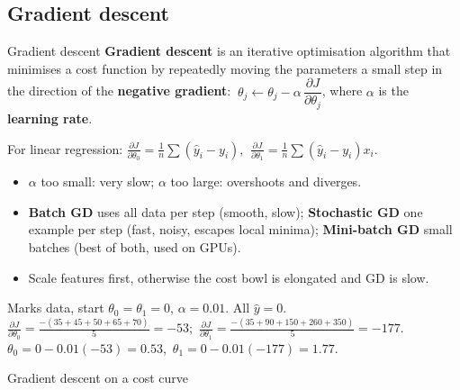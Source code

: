 \subsection{Gradient descent}
\begin{dfn}{Gradient descent}
\textbf{Gradient descent} is an iterative optimisation algorithm that minimises a cost function by repeatedly moving the parameters a small step in the direction of the \textbf{negative gradient}:
$\ \theta_j\leftarrow\theta_j-\alpha\,\dfrac{\partial J}{\partial\theta_j}$, where $\alpha$ is the \textbf{learning rate}.
\end{dfn}
For linear regression: $\frac{\partial J}{\partial\theta_0}=\frac1n\sum(\hat y_i-y_i)$, $\ \frac{\partial J}{\partial\theta_1}=\frac1n\sum(\hat y_i-y_i)x_i$.
\begin{itemize}
  \item $\alpha$ too small: very slow; $\alpha$ too large: overshoots and diverges.
  \item \textbf{Batch GD} uses all data per step (smooth, slow); \textbf{Stochastic GD} one example per step (fast, noisy, escapes local minima); \textbf{Mini-batch GD} small batches (best of both, used on GPUs).
  \item Scale features first, otherwise the cost bowl is elongated and GD is slow.
\end{itemize}

\begin{numer}
Marks data, start $\theta_0=\theta_1=0$, $\alpha=0.01$. All $\hat y=0$.\\
$\frac{\partial J}{\partial\theta_0}=\frac{-(35+45+50+65+70)}{5}=-53$;\ $\frac{\partial J}{\partial\theta_1}=\frac{-(35+90+150+260+350)}{5}=-177$.\\
$\theta_0=0-0.01(-53)=0.53$,\ $\theta_1=0-0.01(-177)=1.77$.
\end{numer}

\begin{drawit}{Gradient descent on a cost curve}
\centering
{}
\end{drawit}


